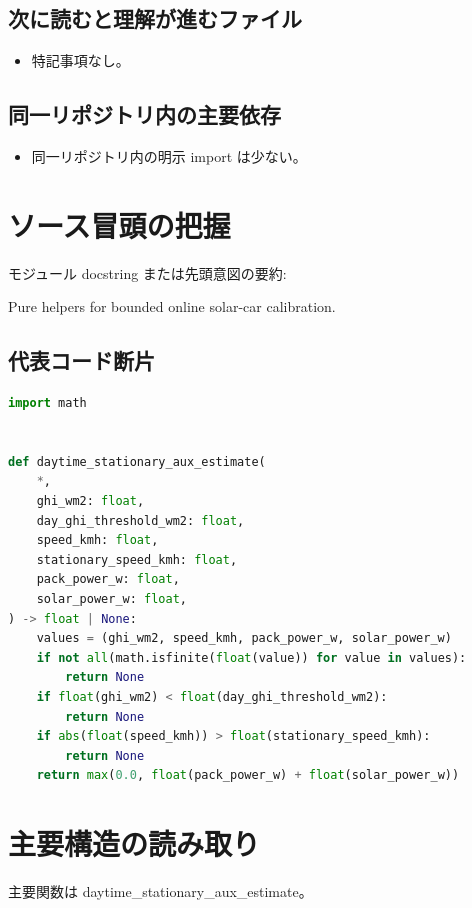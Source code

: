 \documentclass[a4paper,11pt]{article}
\begin{document}
        \subsection{次に読むと理解が進むファイル}
        \begin{itemize}[leftmargin=1.6em]
        \item 特記事項なし。
        \end{itemize}

        \subsection{同一リポジトリ内の主要依存}
        \begin{itemize}[leftmargin=1.6em]
        \item 同一リポジトリ内の明示 import は少ない。
        \end{itemize}

        \section{ソース冒頭の把握}
        モジュール docstring または先頭意図の要約:

        Pure helpers for bounded online solar-car calibration.

        \subsection{代表コード断片}
        \begin{lstlisting}[language=Python]
import math


def daytime_stationary_aux_estimate(
    *,
    ghi_wm2: float,
    day_ghi_threshold_wm2: float,
    speed_kmh: float,
    stationary_speed_kmh: float,
    pack_power_w: float,
    solar_power_w: float,
) -> float | None:
    values = (ghi_wm2, speed_kmh, pack_power_w, solar_power_w)
    if not all(math.isfinite(float(value)) for value in values):
        return None
    if float(ghi_wm2) < float(day_ghi_threshold_wm2):
        return None
    if abs(float(speed_kmh)) > float(stationary_speed_kmh):
        return None
    return max(0.0, float(pack_power_w) + float(solar_power_w))
\end{lstlisting}


        \section{主要構造の読み取り}
        主要関数は daytime\_stationary\_aux\_estimate。
\end{document}

